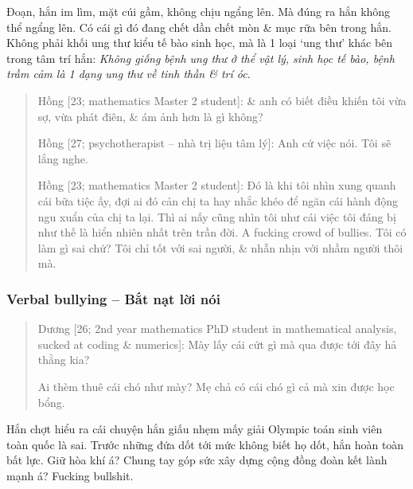 \documentclass[12pt]{article}
\begin{document}
Đoạn, hắn im lìm, mặt cúi gầm, không chịu ngẩng lên. Mà đúng ra hắn không thể ngẩng lên. Có cái gì đó đang chết dần chết mòn \& mục rữa bên trong hắn. Không phải khối ung thư kiểu tế bào sinh học, mà là 1 loại `ung thư' khác bên trong tâm trí hắn: {\it Không giống bệnh ung thư ở thể vật lý, sinh học tế bào, bệnh trầm cảm là 1 dạng ung thư về tinh thần \& trí óc}.
\begin{quote}
	{\sf Hồng [23; mathematics Master 2 student]}: \& anh có biết điều khiến tôi vừa sợ, vừa phát điên, \& ám ảnh hơn là gì không?
	
	{\sf Hồng [27; psychotherapist -- nhà trị liệu tâm lý]}: Anh cứ việc nói. Tôi sẽ lắng nghe.
	
	{\sf Hồng [23; mathematics Master 2 student]}: Đó là khi tôi nhìn xung quanh cái bữa tiệc ấy, đợi ai đó cản chị ta hay nhắc khéo để ngăn cái hành động ngu xuẩn của chị ta lại. Thì ai nấy cũng nhìn tôi như cái việc tôi đáng bị như thế là hiển nhiên nhất trên trần đời. A fucking crowd of bullies. Tôi có làm gì sai chứ? Tôi chỉ tốt với sai người, \& nhẫn nhịn với nhầm người thôi mà.
\end{quote}

\subsubsection{Verbal bullying -- Bắt nạt lời nói}

\begin{quote}
	{\sf Dương [26; 2nd year mathematics PhD student in mathematical analysis, sucked at coding \& numerics]}: Mày lấy cái cứt gì mà qua được tới đây hả thằng kia?
	
	Ai thèm thuê cái chó như mày? Mẹ chả có cái chó gì cả mà xin được học bổng.
\end{quote}
Hắn chợt hiểu ra cái chuyện hắn giấu nhẹm mấy giải Olympic toán sinh viên toàn quốc là sai. Trước những đứa dốt tới mức không biết họ dốt, hắn hoàn toàn bất lực. Giữ hòa khí á? Chung tay góp sức xây dựng cộng đồng đoàn kết lành mạnh á? Fucking bullshit.
\end{document}
